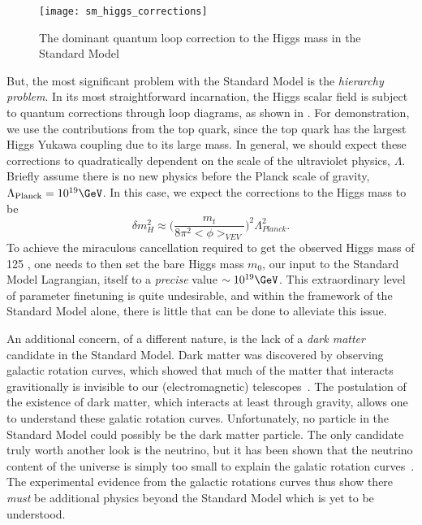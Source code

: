 \begin{figure}[tbp]
\caption{The dominant quantum loop correction to the Higgs mass in the Standard Model} \label{fig:sm_higgs_corrections}
\texttt{[image: sm\_higgs\_corrections]}
\end{figure}
But, the most significant problem with the Standard Model is the \textit{hierarchy problem}.
In its most straightforward incarnation, the Higgs scalar field is subject to quantum corrections through loop diagrams, as shown in .
For demonstration, we use the contributions from the top quark, since the top quark has the largest Higgs Yukawa coupling due to its large mass.
In general, we should expect these corrections to quadratically dependent on the scale of the ultraviolet physics, $\Lambda$.
Briefly assume there is no new physics before the Planck scale of gravity, $\Lambda_{\text{Planck}} = 10^{19} \GeV$.
In this case, we expect the corrections to the Higgs mass to be
\begin{equation}
\delta m^2_H \approx \Big( \frac{m_t}{8\pi^2 <\phi>_{VEV}} \Big)^2 \Lambda_{Planck}^2.
\end{equation}
To achieve the miraculous cancellation required to get the observed Higgs mass of 125 \GeV, one needs to then set the bare Higgs mass $m_0$, our input to the Standard Model Lagrangian, itself to a \textit{precise} value $\order 10^{19} \GeV$.
This extraordinary level of parameter finetuning is quite undesirable, and within the framework of the Standard Model alone, there is little that can be done to alleviate this issue.

An additional concern, of a different nature, is the lack of a \textit{dark matter} candidate in the Standard Model.
Dark matter was discovered by observing galactic rotation curves, which showed that much of the matter that interacts gravitionally is invisible to our (electromagnetic) telescopes~\cite{Rubin:1970zza, Roberts:1970zza, Rubin:1980zd, Rubin:1985ze, Bosma:1981zz, Persic:1995ru, darkMatterPrimer}.
The postulation of the existence of dark matter, which interacts at least through gravity, allows one to understand these galatic rotation curves.
Unfortunately, no particle in the Standard Model could possibly be the dark matter particle.
The only candidate truly worth another look is the neutrino, but it has been shown that the neutrino content of the universe is simply too small to explain the galatic rotation curves~\cite{Quigg:2008ab, darkMatterPrimer}.
The experimental evidence from the galactic rotations curves thus show there \textit{must} be additional physics beyond the Standard Model which is yet to be understood.

